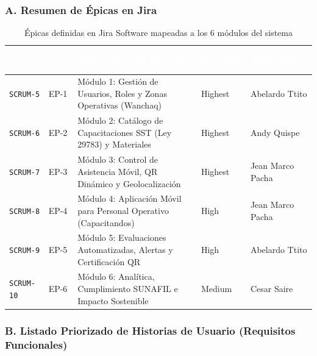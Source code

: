 \documentclass[11pt,a4paper]{article}
\begin{document}
\subsubsection*{A. Resumen de Épicas en Jira}

\begin{table}[H]
\centering
\caption{Épicas definidas en Jira Software mapeadas a los 6 módulos del sistema}
\label{tab:epicas}
\renewcommand{\arraystretch}{1.22}
\small
\begin{tabularx}{\textwidth}{C{1.9cm} C{1.2cm} Y C{1.8cm} L{2.8cm}}
\toprule
{}
\textcolor{white}{\textbf{Clave Jira}} & \textcolor{white}{\textbf{Cód.}} & \textcolor{white}{\textbf{Épica / Módulo Funcional}} & \textcolor{white}{\textbf{Prioridad}} & \textcolor{white}{\textbf{Responsable}} \\
\midrule
\texttt{SCRUM-5} & EP-1 & Módulo 1: Gestión de Usuarios, Roles y Zonas Operativas (Wanchaq) & Highest & Abelardo Ttito \\
\texttt{SCRUM-6} & EP-2 & Módulo 2: Catálogo de Capacitaciones SST (Ley 29783) y Materiales & Highest & Andy Quispe \\
\texttt{SCRUM-7} & EP-3 & Módulo 3: Control de Asistencia Móvil, QR Dinámico y Geolocalización & Highest & Jean Marco Pacha \\
\texttt{SCRUM-8} & EP-4 & Módulo 4: Aplicación Móvil para Personal Operativo (Capacitandos) & High & Jean Marco Pacha \\
\texttt{SCRUM-9} & EP-5 & Módulo 5: Evaluaciones Automatizadas, Alertas y Certificación QR & High & Abelardo Ttito \\
\texttt{SCRUM-10} & EP-6 & Módulo 6: Analítica, Cumplimiento SUNAFIL e Impacto Sostenible & Medium & Cesar Saire \\
\bottomrule
\end{tabularx}
\end{table}

\subsubsection*{B. Listado Priorizado de Historias de Usuario (Requisitos Funcionales)}
\end{document}

